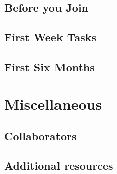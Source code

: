 \documentclass[
]{book}
\begin{document}
\hypertarget{before-you-join}{%
\section{Before you Join}\label{before-you-join}}

\hypertarget{first-week-tasks}{%
\section{First Week Tasks}\label{first-week-tasks}}

\hypertarget{first-six-months}{%
\section{First Six Months}\label{first-six-months}}

\hypertarget{miscellaneous}{%
\chapter{Miscellaneous}\label{miscellaneous}}

\hypertarget{collaborators}{%
\section{Collaborators}\label{collaborators}}

\hypertarget{extra-resources}{%
\section{Additional resources}\label{extra-resources}}

  
\end{document}
